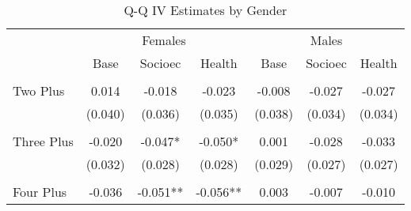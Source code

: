 \begin{table}[htpb!]\caption{Q-Q IV Estimates by Gender} 
\label{TWINtab:gend}\vspace{-5mm}\begin{center}\begin{tabular}{lcccccc}
\toprule \toprule 
&\multicolumn{3}{c}{Females}&\multicolumn{3}{c}{Males}\\ 
\cmidrule(r){2-4} \cmidrule(r){5-7} 
&Base&Socioec&Health&Base&Socioec&Health \\ \midrule 
\begin{footnotesize}\end{footnotesize}&\begin{footnotesize}\end{footnotesize}&\begin{footnotesize}\end{footnotesize}&\begin{footnotesize}\end{footnotesize}&\begin{footnotesize}\end{footnotesize}&\begin{footnotesize}\end{footnotesize}&\\Two Plus &0.014&-0.018&-0.023&-0.008&-0.027&-0.027\\
&(0.040)&(0.036)&(0.035)&(0.038)&(0.034)&(0.034)\\
\begin{footnotesize}\end{footnotesize}&\begin{footnotesize}\end{footnotesize}&\begin{footnotesize}\end{footnotesize}&\begin{footnotesize}\end{footnotesize}&\begin{footnotesize}\end{footnotesize}&\begin{footnotesize}\end{footnotesize}&\\Three Plus &-0.020&-0.047*&-0.050*&0.001&-0.028&-0.033\\
&(0.032)&(0.028)&(0.028)&(0.029)&(0.027)&(0.027)\\
\begin{footnotesize}\end{footnotesize}&\begin{footnotesize}\end{footnotesize}&\begin{footnotesize}\end{footnotesize}&\begin{footnotesize}\end{footnotesize}&\begin{footnotesize}\end{footnotesize}&\begin{footnotesize}\end{footnotesize}&\\Four Plus &-0.036&-0.051**&-0.056**&0.003&-0.007&-0.010\\

\end{tabular}
\end{center}
\end{table}
